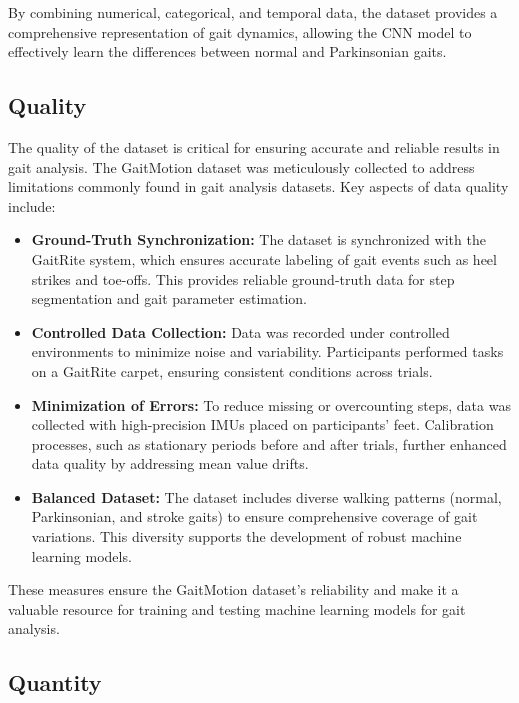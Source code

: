 By combining numerical, categorical, and temporal data, the dataset provides a comprehensive representation of gait dynamics, allowing the CNN model to effectively learn the differences between normal and Parkinsonian gaits.\cite{ZhangWenwen:2022}

\subsection{Quality}

The quality of the dataset is critical for ensuring accurate and reliable results in gait analysis. The GaitMotion dataset was meticulously collected to address limitations commonly found in gait analysis datasets. Key aspects of data quality include:

\begin{itemize}
	\item \textbf{Ground-Truth Synchronization:}
	The dataset is synchronized with the GaitRite system, which ensures accurate labeling of gait events such as heel strikes and toe-offs. This provides reliable ground-truth data for step segmentation and gait parameter estimation.
	
	\item \textbf{Controlled Data Collection:}
	Data was recorded under controlled environments to minimize noise and variability. Participants performed tasks on a GaitRite carpet, ensuring consistent conditions across trials.
	
	\item \textbf{Minimization of Errors:}
	To reduce missing or overcounting steps, data was collected with high-precision IMUs placed on participants’ feet. Calibration processes, such as stationary periods before and after trials, further enhanced data quality by addressing mean value drifts.
	
	\item \textbf{Balanced Dataset:}
	The dataset includes diverse walking patterns (normal, Parkinsonian, and stroke gaits) to ensure comprehensive coverage of gait variations. This diversity supports the development of robust machine learning models.\cite{ZhangWenwen:2022}
\end{itemize}

These measures ensure the GaitMotion dataset's reliability and make it a valuable resource for training and testing machine learning models for gait analysis.

\subsection{Quantity}


